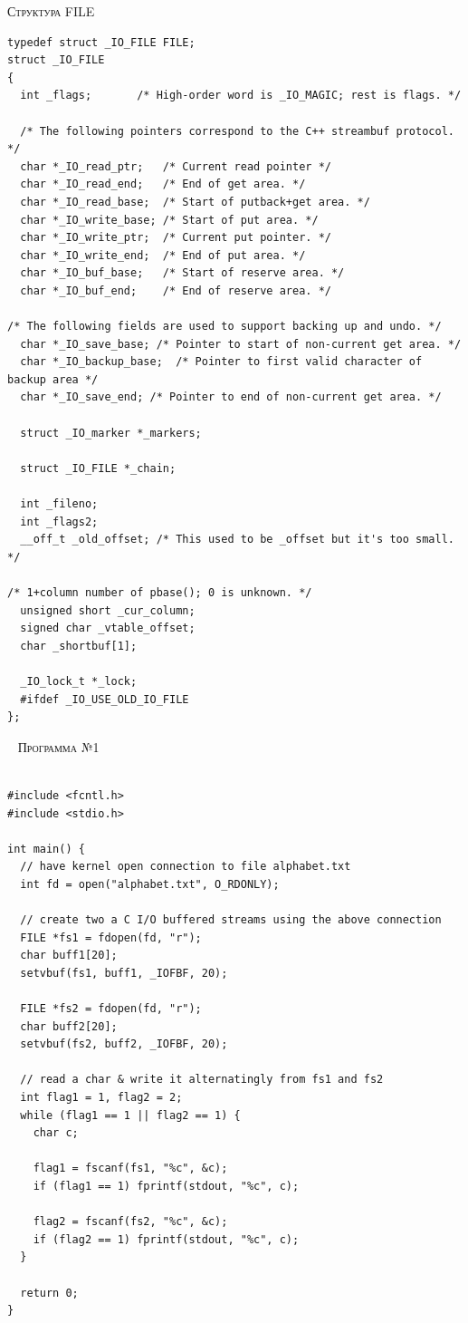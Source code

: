 \textsc{\huge Структура FILE} \\

\begin{lstlisting}
typedef struct _IO_FILE FILE;
struct _IO_FILE
{
  int _flags;		/* High-order word is _IO_MAGIC; rest is flags. */

  /* The following pointers correspond to the C++ streambuf protocol. */
  char *_IO_read_ptr;	/* Current read pointer */
  char *_IO_read_end;	/* End of get area. */
  char *_IO_read_base;	/* Start of putback+get area. */
  char *_IO_write_base;	/* Start of put area. */
  char *_IO_write_ptr;	/* Current put pointer. */
  char *_IO_write_end;	/* End of put area. */
  char *_IO_buf_base;	/* Start of reserve area. */
  char *_IO_buf_end;	/* End of reserve area. */

/* The following fields are used to support backing up and undo. */
  char *_IO_save_base; /* Pointer to start of non-current get area. */
  char *_IO_backup_base;  /* Pointer to first valid character of backup area */
  char *_IO_save_end; /* Pointer to end of non-current get area. */

  struct _IO_marker *_markers;

  struct _IO_FILE *_chain;

  int _fileno;
  int _flags2;
  __off_t _old_offset; /* This used to be _offset but it's too small.  */

/* 1+column number of pbase(); 0 is unknown. */
  unsigned short _cur_column;
  signed char _vtable_offset;
  char _shortbuf[1];

  _IO_lock_t *_lock;
  #ifdef _IO_USE_OLD_IO_FILE
};
\end{lstlisting}
~\newline
\textsc{\huge Программа №1} \\
~\newline
\begin{lstlisting}
#include <fcntl.h>
#include <stdio.h>

int main() {
  // have kernel open connection to file alphabet.txt
  int fd = open("alphabet.txt", O_RDONLY);
	
  // create two a C I/O buffered streams using the above connection
  FILE *fs1 = fdopen(fd, "r");
  char buff1[20];
  setvbuf(fs1, buff1, _IOFBF, 20);
	
  FILE *fs2 = fdopen(fd, "r");
  char buff2[20];
  setvbuf(fs2, buff2, _IOFBF, 20);
	
  // read a char & write it alternatingly from fs1 and fs2
  int flag1 = 1, flag2 = 2;
  while (flag1 == 1 || flag2 == 1) {
    char c;
		
    flag1 = fscanf(fs1, "%c", &c);
    if (flag1 == 1) fprintf(stdout, "%c", c);
		
    flag2 = fscanf(fs2, "%c", &c);
    if (flag2 == 1) fprintf(stdout, "%c", c);
  }
	
  return 0;
}
\end{lstlisting}
